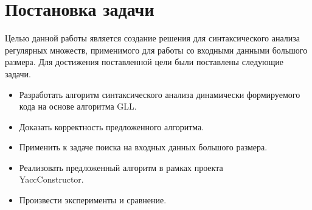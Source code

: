 \section{Постановка задачи}
Целью данной работы является создание решения для синтаксического анализа регулярных множеств, применимого для работы со входными данными большого размера. Для достижения поставленной цели были поставлены следующие задачи.

\begin{itemize}  
\item Разработать алгоритм синтаксического анализа динамически  формируемого кода на основе алгоритма GLL. 
\item Доказать корректность предложенного алгоритма.
\item Применить к задаче поиска на входных данных большого размера.
\item Реализовать предложенный алгоритм в рамках проекта \\ YaccConstructor.
\item Произвести эксперименты и сравнение.
\end{itemize}
